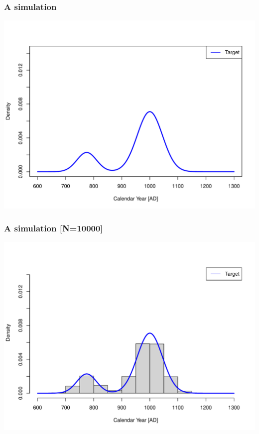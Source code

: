 \documentclass{beamer}
\begin{document}
\begin{frame}[t]
  \frametitle{A simulation}
    \includegraphics[height=.85\textheight]{sim_target.pdf}
\end{frame}

\begin{frame}[t]
  \frametitle{A simulation [N=10000]}
    \includegraphics[height=.85\textheight]{sim_target_with_hist.pdf}
\end{frame}
\end{document}
